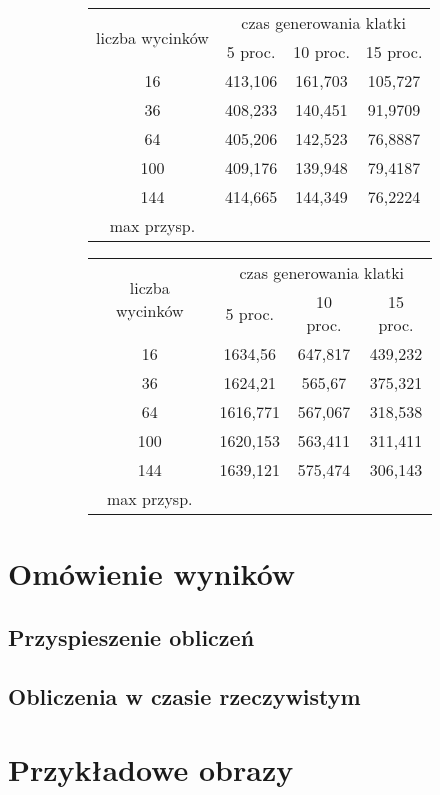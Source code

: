 \begin{figure}[!ht]
\advance\leftskip-2cm
	\begin{subfigure}{.5\textwidth}
\begin{tabular}{|c|c|c|c|} \hline
	    \multirow{2}{*}{liczba wycinków} & \multicolumn{3}{|c|}{czas generowania klatki} \\ \cline{2-4}
	 	& 5 proc. & 10 proc. & 15 proc. \\ \hline
	    16 & 413,106 & 161,703 & 105,727 \\ 
	    36 & 408,233 & 140,451 & 91,9709 \\
		64 & 405,206 & 142,523 & 76,8887 \\
		100 & 409,176 & 139,948 & 79,4187 \\
		144 & 414,665 & 144,349 & 76,2224 \\ \hline
		max przysp. & & & \\
		\hline
\end{tabular}
	\end{subfigure}
	\hspace{2cm}
	\begin{subfigure}{.5\textwidth}
\begin{tabular}{|c|c|c|c|} \hline
	    \multirow{2}{*}{liczba wycinków} & \multicolumn{3}{|c|}{czas generowania klatki} \\ \cline{2-4}
	 	& 5 proc. & 10 proc. & 15 proc. \\ \hline
	    16 & 1634,56 & 647,817 & 439,232 \\ 
	    36 & 1624,21 & 565,67 & 375,321 \\
		64 & 1616,771 & 567,067 & 318,538 \\
		100 & 1620,153 & 563,411 & 311,411 \\
		144 & 1639,121 & 575,474 & 306,143 \\ \hline
		max przysp. & & & \\
		\hline
\end{tabular}
	\end{subfigure}
\end{figure}

\section{Omówienie wyników}
	\subsection{Przyspieszenie obliczeń}
	\subsection{Obliczenia w czasie rzeczywistym}
\section{Przykładowe obrazy}